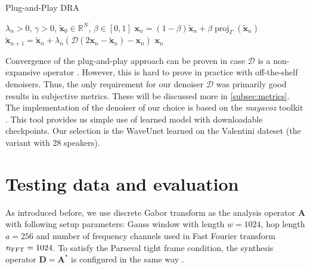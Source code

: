 \documentclass[conference]{IEEEtran}
\begin{document}
\begin{algorithm}
	\caption{Plug-and-Play DRA}
	\begin{algorithmic}[1]\label{alg:pnp}
		\renewcommand{\algorithmicrequire}{\textbf{Input:}}
		\renewcommand{\algorithmicensure}{\textbf{Output:}}
		\REQUIRE $ \lambda_n > 0 $, $ \gamma>0 $, $ \mathbf{\widetilde{x}}_0 \in \mathbb{R}^{N} $, $\beta \in [0, 1]$
		\STATE %
		$\mathbf{x}_n= (1-\beta)\mathbf{\widetilde{x}}_n + \beta \operatorname{proj}_{\Gamma}(\mathbf{\widetilde{x}}_n) $ 
		\STATE $ \mathbf{\widetilde{x}}_{n+1} = \mathbf{\widetilde{x}}_n + \lambda_n \left( \mathcal{D} \left(2\mathbf{x}_n-\mathbf{\widetilde{x}}_n \right)-\mathbf{x}_n\right)$
		\ENDFOR
		\RETURN $\mathbf{x}_n$ 
	\end{algorithmic} 
\end{algorithm}


Convergence of the plug-and-play approach can be proven in case $\mathcal{D}$ is a non-expansive operator \cite{Chan2016}.
However, this is hard to prove in practice with off-the-shelf denoisers.
Thus, the only requirement for our denoiser $\mathcal{D}$ was primarily good results in subjective metrics.
These will be discussed more in \ref{subsec:metrics}.
The implementation of the denoiser of our choice is based on the \textit{mayavoz} toolkit \cite{Shahul2023}.
This tool provides us simple use of learned model with downloadable checkpoints.
Our selection is the WaveUnet learned on the Valentini dateset \cite{ValentiniBotinhao2017} (the variant with 28 speakers).

\section{Testing data and evaluation}\label{sec:eval}

As introduced before, we use discrete Gabor transform as the analysis operator $\mathbf{A}$ with following setup parameters: Gauss window with length $w =1024 $, hop length $a = 256$ and number of frequency channels used in Fast Fourier transform %
$n_{\textup{FFT}} = 1024$.
To satisfy the Parseval tight frame condition, the synthesis operator $\mathbf{D} = \mathbf{A}^*$ is configured in the same way \cite{Mokry2020}.
\end{document}
